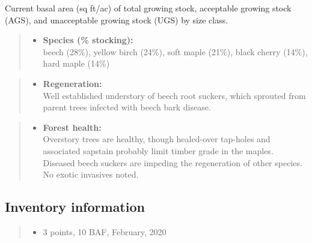 \documentclass[]{tufte-handout}
\providecommand{\tightlist}{%
  \setlength{\itemsep}{0pt}\setlength{\parskip}{0pt}}
\begin{document}
\vspace{2pt}
\footnotesize\parbox{200pt}{Current basal area (sq ft/ac) of total growing stock, acceptable growing stock (AGS), and unacceptable growing stock (UGS) by size class.}\normalsize

\begin{quote}
\begin{itemize}
\tightlist
\item
  \textbf{Species (\% stocking):}\\
  \vspace{2pt} beech (28\%), yellow birch (24\%), soft maple (21\%),
  black cherry (14\%), hard maple (14\%)
\end{itemize}
\end{quote}

\begin{quote}
\begin{itemize}
\tightlist
\item
  \textbf{Regeneration:}\\
  \vspace{2pt} Well established understory of beech root suckers, which
  sprouted from parent trees infected with beech bark disease.
\end{itemize}
\end{quote}

\begin{quote}
\begin{itemize}
\tightlist
\item
  \textbf{Forest health:}\\
  \vspace{2pt} Overstory trees are healthy, though healed-over tap-holes
  and associated sapstain probably limit timber grade in the maples.
  Diseased beech suckers are impeding the regeneration of other species.
  No exotic invasives noted.
\end{itemize}
\end{quote}

\subsection{Inventory information}\label{inventory-information-3}

\begin{quote}
\begin{itemize}
\tightlist
\item
  3 points, 10 BAF, February, 2020
\end{itemize}
\end{quote}
\end{document}
